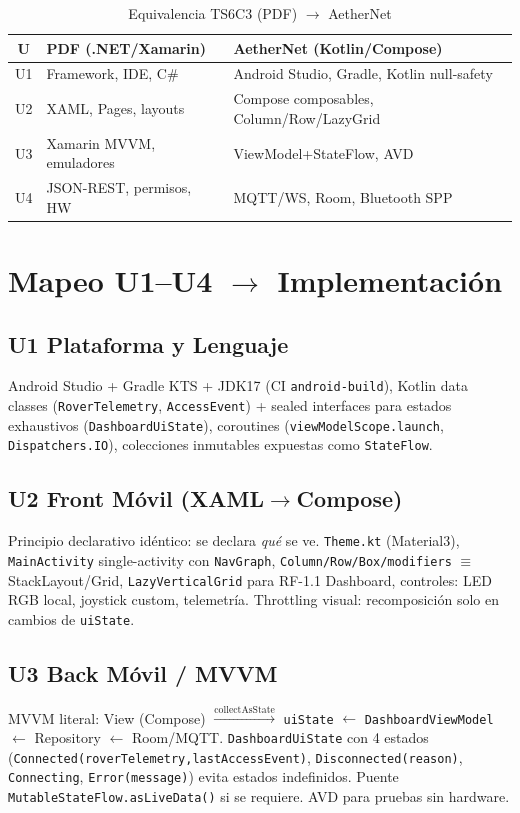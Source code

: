 \documentclass[conference]{IEEEtran}
\begin{document}
\begin{table}[t]
\centering
\caption{Equivalencia TS6C3 (PDF) $\rightarrow$ AetherNet}
\label{tab:equiv}
\begin{tabular}{@{}cll@{}}
\toprule
U & PDF (.NET/Xamarin) & AetherNet (Kotlin/Compose) \\
\midrule
U1 & Framework, IDE, C\# & Android Studio, Gradle, Kotlin null-safety \\
U2 & XAML, Pages, layouts & Compose composables, Column/Row/LazyGrid \\
U3 & Xamarin MVVM, emuladores & ViewModel+StateFlow, AVD \\
U4 & JSON-REST, permisos, HW & MQTT/WS, Room, Bluetooth SPP \\
\bottomrule
\end{tabular}
\end{table}

\section{Mapeo U1--U4 $\rightarrow$ Implementación}
\subsection{U1 Plataforma y Lenguaje}
Android Studio + Gradle KTS + JDK17 (CI \texttt{android-build}), Kotlin data classes (\texttt{RoverTelemetry}, \texttt{AccessEvent}) + sealed interfaces para estados exhaustivos (\texttt{DashboardUiState}), coroutines (\texttt{viewModelScope.launch}, \texttt{Dispatchers.IO}), colecciones inmutables expuestas como \texttt{StateFlow}.

\subsection{U2 Front Móvil (XAML$\rightarrow$Compose)}
Principio declarativo idéntico: se declara \emph{qué} se ve. \texttt{Theme.kt} (Material3), \texttt{MainActivity} single-activity con \texttt{NavGraph}, \texttt{Column/Row/Box/modifiers} $\equiv$ StackLayout/Grid, \texttt{LazyVerticalGrid} para RF-1.1 Dashboard, controles: LED RGB local, joystick custom, telemetría. Throttling visual: recomposición solo en cambios de \texttt{uiState}.

\subsection{U3 Back Móvil / MVVM}
MVVM literal: View (Compose) $\xrightarrow{\text{collectAsState}}$ \texttt{uiState} $\leftarrow$ \texttt{DashboardViewModel} $\leftarrow$ Repository $\leftarrow$ Room/MQTT. \texttt{DashboardUiState} con 4 estados (\texttt{Connected(roverTelemetry,lastAccessEvent)}, \texttt{Disconnected(reason)}, \texttt{Connecting}, \texttt{Error(message)}) evita estados indefinidos. Puente \texttt{MutableStateFlow.asLiveData()} si se requiere. AVD para pruebas sin hardware.
\end{document}
